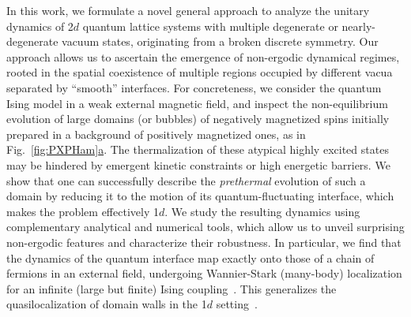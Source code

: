 \documentclass[reprint,aps,prl,superscriptaddress,english,nolongbibliography]{revtex4-2}
\begin{document}
In this work, we formulate a novel general approach to analyze the unitary dynamics of 2$d$ quantum  lattice systems with multiple degenerate or nearly-degenerate vacuum states, originating from a broken discrete symmetry. 
Our approach allows us to ascertain the emergence of non-ergodic  dynamical regimes,  rooted in the spatial coexistence of multiple regions occupied by different vacua separated by ``smooth'' interfaces.
For concreteness, we consider the quantum Ising model in a weak external magnetic field, and inspect the non-equilibrium evolution of large domains (or bubbles) of negatively magnetized spins initially prepared in a background of positively magnetized ones, as in Fig.~\hyperref[fig:PXPHam]{\ref{fig:PXPHam}a}. 
The thermalization of these atypical highly excited states may be hindered by emergent kinetic constraints or high energetic barriers. We show that one can successfully describe the \emph{prethermal} evolution of such a domain by reducing it to the motion of its quantum-fluctuating interface, which makes the problem effectively 1$d$. We study the resulting dynamics using complementary analytical and numerical tools, which allow us to unveil surprising non-ergodic features and characterize their robustness. In particular, we find that the dynamics of the quantum interface map exactly onto those of a chain of fermions in an external field, undergoing Wannier-Stark (many-body) localization for an infinite (large but finite) Ising coupling~\cite{Refael2019From,Schulz2019Stark,scherg2021observing,Morong2021Observation}.
This generalizes the quasilocalization of domain walls in the 1$d$ setting~\cite{Mazza2019Suppression,Lerose2020Quasilocalized}.
\end{document}
